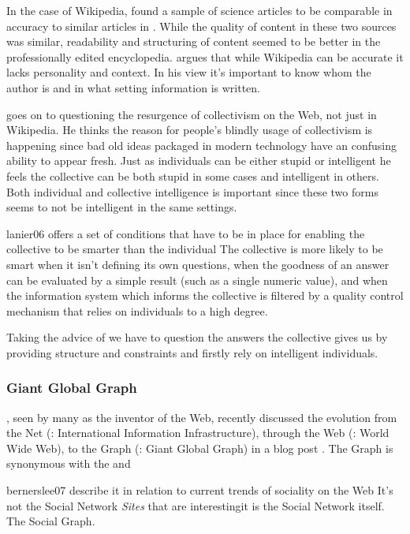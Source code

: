 In the case of Wikipedia, \citet{giles05} found a sample of science articles
to be comparable in accuracy to similar articles in
. While the quality of content in
these two sources was similar, readability and structuring of content seemed
to be better in the professionally edited encyclopedia.
\citet{lanier06} argues that while Wikipedia can be accurate it lacks
personality and context. In his view it's important to know whom the author is
and in what setting information is written.

\citet{lanier06} goes on to questioning the resurgence of collectivism on the
Web, not just in Wikipedia.
He thinks the reason for people's blindly usage of collectivism is happening
since bad old ideas packaged in modern technology have an confusing ability to
appear fresh. Just as individuals can be either
stupid or intelligent he feels the collective can be both stupid in some cases
and intelligent in others. Both individual and collective intelligence is
important since these two forms seems to not be intelligent in the same
settings.

\begin{fullquote}{lanier06}{%
  offers a set of conditions that have to be in place for enabling the
  collective to be smarter than the individual}
    The collective is more likely to be smart when it isn't defining its own
    questions, when the goodness of an answer can be evaluated by a simple
    result (such as a single numeric value), and when the information system
    which informs the collective is filtered by a quality control mechanism
    that relies on individuals to a high degree.
\end{fullquote}

Taking the advice of \citeauthor{lanier06} we have to question the answers
the collective gives us by providing structure and constraints and firstly
rely on intelligent individuals.

\subsubsection{Giant Global Graph}
\label{section:social.navigation.sociality.the.social.web.ggg}
\citeauthor{bernerslee07}, seen by many as the inventor of the Web,
recently discussed the evolution from the Net (: International
Information Infrastructure), through the Web (: World Wide Web),
to the Graph (: Giant Global Graph) in a
blog post \citeyearpar{bernerslee07}. The Graph is synonymous with the
%
and
\begin{fullquote}{bernerslee07}{%
  describe it in relation to current trends of sociality on the Web}
    It's not the Social Network \emph{Sites} that are interesting\dash{}it is
    the Social Network itself. The Social Graph.
\end{fullquote}

